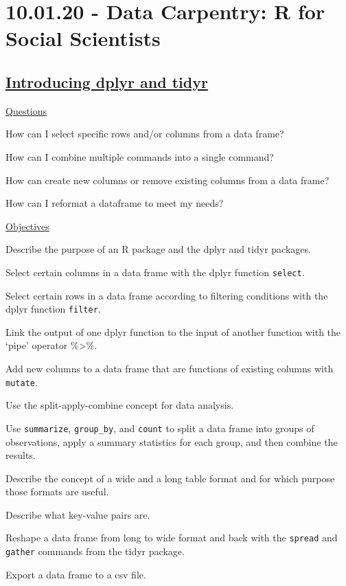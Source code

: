\documentclass[12pt]{article}
\begin{document}
\newpage\flushleft\section{10.01.20 - Data Carpentry: R for Social Scientists}
\subsection{\href{https://datacarpentry.org/r-socialsci/03-dplyr-tidyr/index.html}{\textbf{Introducing dplyr and tidyr}}}
\color{gray}
\underline{Questions}

How can I select specific rows and/or columns from a data frame?

How can I combine multiple commands into a single command?

How can create new columns or remove existing columns from a data frame?

How can I reformat a dataframe to meet my needs?

\underline{Objectives}

Describe the purpose of an R package and the dplyr and tidyr packages.

Select certain columns in a data frame with the dplyr function \texttt{select}.

Select certain rows in a data frame according to filtering conditions with the dplyr function \texttt{filter}.

Link the output of one dplyr function to the input of another function with the ‘pipe’ operator \%\textgreater\%.

Add new columns to a data frame that are functions of existing columns with \texttt{mutate}.

Use the split-apply-combine concept for data analysis.

Use \texttt{summarize}, \texttt{group\_by}, and \texttt{count} to split a data frame into groups of observations, apply a summary statistics for each group, and then combine the results.

Describe the concept of a wide and a long table format and for which purpose those formats are useful.

Describe what key-value pairs are.

Reshape a data frame from long to wide format and back with the \texttt{spread} and \texttt{gather} commands from the tidyr package.

Export a data frame to a csv file.

\color{black}
\vspace{1em}
\end{document}
